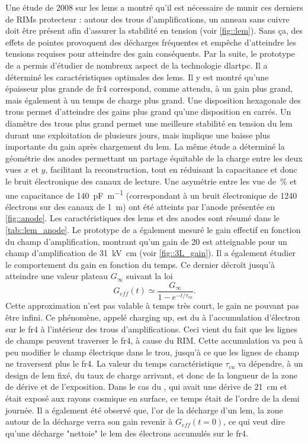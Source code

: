       Une étude de 2008 sur les \glspl{lem}\cite{Breskin2008} a montré qu'il est nécessaire de munir ces derniers de RIMs protecteur : autour des trous d'amplifications, un anneau sans cuivre doit être présent afin d'assurer la stabilité en tension (voir \autoref{fig::lem}). Sans ça, des effets de pointes provoquent des décharges fréquentes et empêche d'atteindre les tensions requises pour atteindre des gain conséquents. Par la suite, le prototype de \threeL{}\cite{Cantini2013,Cantini2014} a permis d'étudier de nombreux aspect de la technologie \gls{dlartpc}. Il a déterminé les caractéristiques optimales des \glspl{lem}. Il y est montré qu'une épaisseur plus grande de \gls{fr4} correspond, comme attendu, à un gain plus grand, mais également à un temps de charge plus grand. Une disposition hexagonale des trous permet d'atteindre des gains plus grand qu'une disposition en carrés. Un diamètre des trous plus grand permet une meilleure stabilité en tension du \gls{lem} durant une exploitation de plusieurs jours, mais implique une baisse plus importante du gain après chargement du \gls{lem}. La même étude a déterminé la géométrie des anodes permettant un partage équitable de la charge entre les deux vues $x$ et $y$, facilitant la reconstruction, tout en réduisant la capacitance et donc le bruit électronique des canaux de lecture. Une asymétrie entre les vue de \,\% et une capacitance de \SI{140}{\pico\farad\per\meter} (correspondant à un bruit électronique de 1240 électrons sur des canaux de \SI{1}{\meter}) ont été atteints par l'anode présentée en \autoref{fig::anode}. Les caractéristiques des \glspl{lem} et des anodes sont résumé dans le \autoref{tab::lem_anode}. Le prototype de \threeL{} a également mesuré le gain effectif en fonction du champ d'amplification, montrant qu'un gain de 20 est atteignable pour un champ d'amplification de \SI{31}{\kilo\volt\centi\meter} (voir \autoref{fig::3L_gain}). Il a également étudier le comportement du gain en fonction du temps. Ce dernier décroît jusqu'à atteindre une valeur plateau $G_{\infty}$ suivant la loi
      \begin{equation}
        G_{eff}(t)\simeq \frac{G_{\infty}}{1-e^{-t/\tau_{cu}}}.
      \end{equation}
      Cette approximation n'est pas valable à temps très court, le gain ne pouvant pas être infini. Ce phénomène, appelé charging up, est du à l'accumulation d'électron sur le \gls{fr4} à l'intérieur des trous d'amplifications. Ceci vient du fait que les lignes de champs peuvent traverser le \gls{fr4}, à cause du RIM. Cette accumulation va peu à peu modifier le champ électrique dans le trou, jusqu'à ce que les lignes de champ ne traversent plus le \gls{fr4}. La valeur du temps caractéristique $\tau_{cu}$ va dépendre, à un design de \gls{lem} fixé, du taux de charge arrivant, et donc de la longueur de la zone de dérive et de l'exposition. Dans le cas du \threeL{}, qui avait une dérive de \SI{21}{\centi\meter} et était exposé aux rayons cosmique en surface, ce temps était de l'ordre de la demi journée. Il a également été observé que, l'or de la décharge d'un \gls{lem}, la zone autour de la décharge verra son gain revenir à $G_{eff}(t=0)$, ce qui veut dire qu'une décharge "nettoie" le \gls{lem} des électrons accumulés sur le \gls{fr4}.


